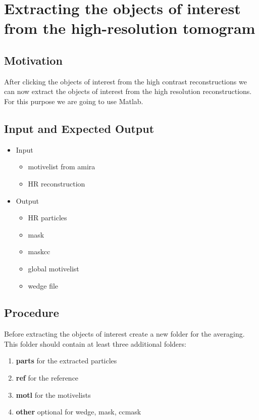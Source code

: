 \documentclass[12pt,a4paper]{scrartcl}
\begin{document}
{\section{Extracting the objects of interest from the high-resolution tomogram}
\subsection{Motivation}
After clicking the objects of interest from the high contrast reconstructions we can now extract the objects of interest from the high resolution reconstructions. For this purpose we are going to use Matlab.

\subsection{Input and Expected Output}
\begin{itemize}
\item Input
\begin{itemize}
\item motivelist from amira
\item HR reconstruction 
\end{itemize}
\item Output
\begin{itemize}
\item HR particles
\item mask
\item maskcc
\item global motivelist
\item wedge file    
\end{itemize} 
\end{itemize}
\subsection{Procedure}

Before extracting the objects of interest create a new folder for the averaging. This folder should contain at least three additional folders:

\begin{enumerate}
\item \textbf{parts} for the extracted particles
\item \textbf{ref} for the reference
\item \textbf{motl} for the motivelists
\item \textbf{other} optional for wedge, mask, ccmask 
\end{enumerate}


}
\end{document}
